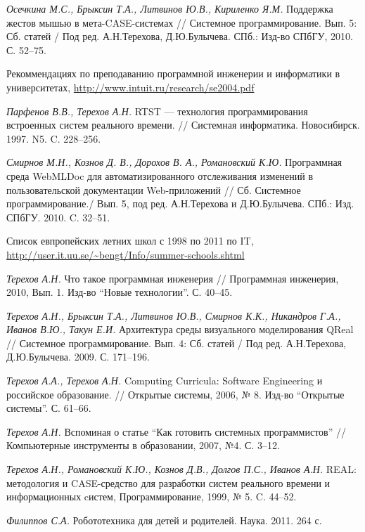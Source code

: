\documentclass[a4paper]{article}
\begin{document}
\begin{thebibliography}{9001}
  \emph{Осечкина М.С., Брыксин Т.А., Литвинов Ю.В., Кириленко Я.М.} Поддержка жестов мышью в мета-CASE-системах // Системное программирование. Вып. 5: Сб. статей / Под ред. А.Н.Терехова, Д.Ю.Булычева.  СПб.: Изд-во СПбГУ, 2010. С. 52--75.

   Рекоммендациях по преподаванию программной инженерии и информатики в университетах, \url{http://www.intuit.ru/research/se2004.pdf}  

   \emph{Парфенов В.В., Терехов А.Н.} RTST --- технология программирования встроенных систем реального времени. // Системная информатика. Новосибирск. 1997. N5. C. 228--256.
  
  \emph{Смирнов М.Н., Кознов Д. В., Дорохов В. А., Романовский К.Ю.} Программная среда WebMLDoc для автоматизированного отслеживания изменений в пользовательской документации Web-приложений // Сб. Системное программирование./ Вып. 5, под ред. А.Н.Терехова и Д.Ю.Булычева. СПб.: Изд. СПбГУ. 2010. C. 32--51.
  
   Список  евпропейских летних школ с 1998 по 2011 по IT, \url{http://user.it.uu.se/~bengt/Info/summer-schools.shtml}

  \emph{Терехов А.Н.} Что такое программная инженерия // Программная инженерия, 2010, Вып. 1. Изд-во ``Новые технологии''. С. 40--45.

   \emph{Терехов А.Н., Брыксин Т.А., Литвинов Ю.В., Смирнов К.К., Никандров  Г.А., Иванов В.Ю., Такун Е.И.} Архитектура среды визуального  моделирования QReal // Системное программирование. Вып. 4: Сб. статей  / Под ред. А.Н.Терехова, Д.Ю.Булычева. 2009. С. 171--196.

  \emph{Терехов А.А., Терехов А.Н.} Computing Curricula: Software Engineering и российское образование. // Открытые системы, 2006, № 8. Изд-во ``Открытые системы''. С. 61--66.

  \emph{Терехов А.Н.} Вспоминая о статье ``Как готовить системных программистов'' // Компьютерные инструменты в образовании, 2007, №4. С. 3--12.

   \emph{Терехов А.Н., Романовский К.Ю., Кознов Д.В., Долгов П.С., Иванов А.Н.} REAL: методология и CASE-средство для разработки систем реального времени и информационных cистем, Программирование, 1999, № 5. C. 44--52.

   \emph{Филиппов С.А.} Робототехника для детей и родителей. Наука. 2011. 264 с.


\end{thebibliography}
\end{document}
